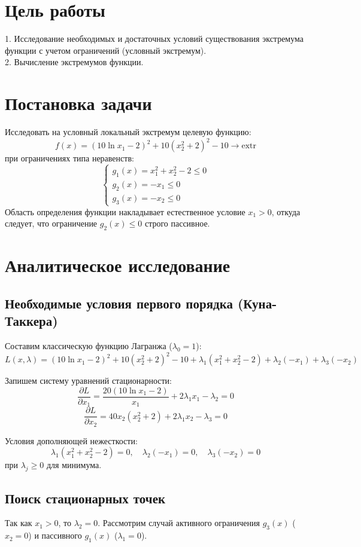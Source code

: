 \documentclass[a4paper,12pt]{article}
\begin{document}
\newpage

\section{Цель работы}
1. Исследование необходимых и достаточных условий существования экстремума функции с учетом ограничений (условный экстремум).\\
2. Вычисление экстремумов функции.

\section{Постановка задачи}
Исследовать на условный локальный экстремум целевую функцию:
$$f(x) = (10\ln x_1 - 2)^2 + 10(x_2^2 + 2)^2 - 10 \rightarrow \text{extr}$$
при ограничениях типа неравенств:
$$\begin{cases}
    g_1(x) = x_1^2 + x_2^2 - 2 \le 0 \\
    g_2(x) = -x_1 \le 0 \\
    g_3(x) = -x_2 \le 0
\end{cases}$$
Область определения функции накладывает естественное условие $x_1 > 0$, откуда следует, что ограничение $g_2(x) \le 0$ строго пассивное.

\section{Аналитическое исследование}

\subsection{Необходимые условия первого порядка (Куна-Таккера)}
Составим классическую функцию Лагранжа ($\lambda_0=1$):
$$L(x, \lambda) = (10\ln x_1 - 2)^2 + 10(x_2^2 + 2)^2 - 10 + \lambda_1(x_1^2 + x_2^2 - 2) + \lambda_2(-x_1) + \lambda_3(-x_2)$$

Запишем систему уравнений стационарности:
$$\frac{\partial L}{\partial x_1} = \frac{20(10\ln x_1 - 2)}{x_1} + 2\lambda_1 x_1 - \lambda_2 = 0$$
$$\frac{\partial L}{\partial x_2} = 40x_2(x_2^2 + 2) + 2\lambda_1 x_2 - \lambda_3 = 0$$

Условия дополняющей нежесткости:
$$\lambda_1(x_1^2 + x_2^2 - 2) = 0, \quad \lambda_2(-x_1) = 0, \quad \lambda_3(-x_2) = 0$$
при $\lambda_j \ge 0$ для минимума.

\subsection{Поиск стационарных точек}
Так как $x_1 > 0$, то $\lambda_2 = 0$. Рассмотрим случай активного ограничения $g_3(x)$ ($x_2 = 0$) и пассивного $g_1(x)$ ($\lambda_1 = 0$).
\end{document}
